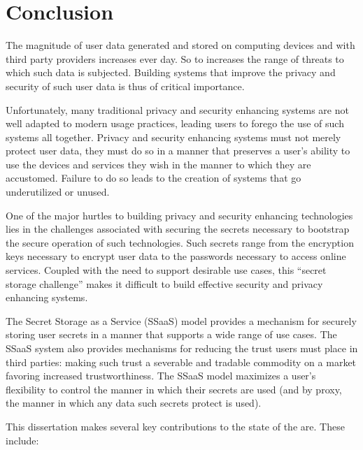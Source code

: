 \chapter{Conclusion}
\label{chap:conclusion}

The magnitude of user data generated and stored on computing devices
and with third party providers increases ever day. So to increases the
range of threats to which such data is subjected.  Building systems
that improve the privacy and security of such user data is thus of
critical importance.

Unfortunately, many traditional privacy and security enhancing systems
are not well adapted to modern usage practices, leading users to
forego the use of such systems all together. Privacy and security
enhancing systems must not merely protect user data, they must do so
in a manner that preserves a user's ability to use the devices and
services they wish in the manner to which they are accustomed. Failure
to do so leads to the creation of systems that go underutilized or
unused.

One of the major hurtles to building privacy and security enhancing
technologies lies in the challenges associated with securing the
secrets necessary to bootstrap the secure operation of such
technologies. Such secrets range from the encryption keys necessary to
encrypt user data to the passwords necessary to access online
services. Coupled with the need to support desirable use cases, this
``secret storage challenge'' makes it difficult to build effective
security and privacy enhancing systems.

The Secret Storage as a Service (SSaaS) model provides a mechanism for
securely storing user secrets in a manner that supports a wide range
of use cases. The SSaaS system also provides mechanisms for reducing
the trust users must place in third parties: making such trust a
severable and tradable commodity on a market favoring increased
trustworthiness. The SSaaS model maximizes a user's flexibility to
control the manner in which their secrets are used (and by proxy, the
manner in which any data such secrets protect is used).

This dissertation makes several key contributions to the state of the
are. These include:

